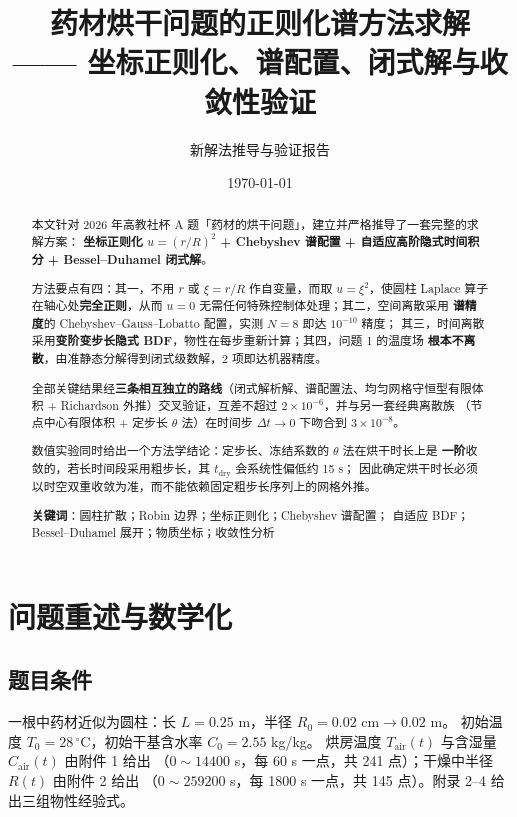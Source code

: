 \documentclass[11pt,a4paper]{article}
\title{\bfseries 药材烘干问题的正则化谱方法求解\\[4pt]
\large —— 坐标正则化、谱配置、闭式解与收敛性验证}
\author{新解法推导与验证报告}
\date{\today}
\theoremstyle{definition}
\begin{document}
\maketitle

\begin{abstract}
\noindent
本文针对 2026 年高教社杯 A 题「药材的烘干问题」，建立并严格推导了一套完整的求解方案：
\textbf{坐标正则化 $u=(r/R)^2$ + Chebyshev 谱配置 + 自适应高阶隐式时间积分
+ Bessel--Duhamel 闭式解}。

方法要点有四：其一，不用 $r$ 或 $\xi=r/R$ 作自变量，而取 $u=\xi^2$，使圆柱 Laplace 算子
在轴心处\textbf{完全正则}，从而 $u=0$ 无需任何特殊控制体处理；其二，空间离散采用
\textbf{谱精度}的 Chebyshev--Gauss--Lobatto 配置，实测 $N=8$ 即达 $10^{-10}$ 精度；
其三，时间离散采用\textbf{变阶变步长隐式 BDF}，物性在每步重新计算；其四，问题 1 的温度场
\textbf{根本不离散}，由准静态分解得到闭式级数解，2 项即达机器精度。

全部关键结果经\textbf{三条相互独立的路线}（闭式解析解、谱配置法、均匀网格守恒型有限体积
+ Richardson 外推）交叉验证，互差不超过 $2\times10^{-6}$，并与另一套经典离散族
（节点中心有限体积 + 定步长 $\theta$ 法）在时间步 $\Delta t\to0$ 下吻合到 $3\times10^{-8}$。

数值实验同时给出一个方法学结论：定步长、冻结系数的 $\theta$ 法在烘干时长上是
\textbf{一阶}收敛的，若长时间段采用粗步长，其 $t_{\text{dry}}$ 会系统性偏低约 15 s；
因此确定烘干时长必须以时空双重收敛为准，而不能依赖固定粗步长序列上的网格外推。

\vspace{4pt}
\noindent\textbf{关键词}：圆柱扩散；Robin 边界；坐标正则化；Chebyshev 谱配置；
自适应 BDF；Bessel--Duhamel 展开；物质坐标；收敛性分析
\end{abstract}

\tableofcontents
\newpage

\section{问题重述与数学化}

\subsection{题目条件}

一根中药材近似为圆柱：长 $L=0.25$ m，半径 $R_0=0.02$ cm$\to0.02$ m。
初始温度 $T_0=28\,^\circ$C，初始干基含水率 $C_0=2.55$ kg/kg。
烘房温度 $T_{\mathrm{air}}(t)$ 与含湿量 $C_{\mathrm{air}}(t)$ 由附件 1 给出
（$0\sim14400$ s，每 60 s 一点，共 241 点）；干燥中半径 $R(t)$ 由附件 2 给出
（$0\sim259200$ s，每 1800 s 一点，共 145 点）。附录 2--4 给出三组物性经验式。
\end{document}

